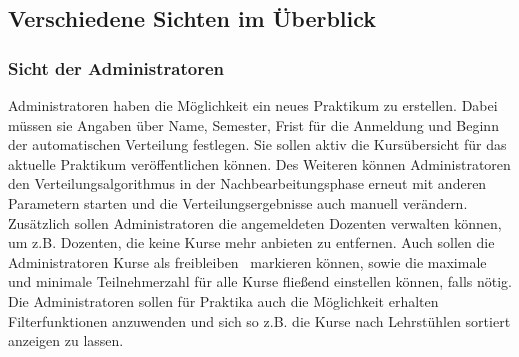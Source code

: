             
                    
        \subsection{Verschiedene Sichten im Überblick}
        \label{Sichten}
            \subsubsection{Sicht der Administratoren}
                Administratoren haben die Möglichkeit ein neues Praktikum zu erstellen.
                Dabei müssen sie Angaben über Name, Semester, Frist für die Anmeldung und Beginn der automatischen Verteilung festlegen.
                Sie sollen aktiv die Kursübersicht für das aktuelle Praktikum veröffentlichen können.
                Des Weiteren können Administratoren den Verteilungsalgorithmus in der Nachbearbeitungsphase erneut mit anderen Parametern starten und die Verteilungsergebnisse auch manuell verändern.
                Zusätzlich sollen Administratoren die angemeldeten Dozenten verwalten können, um z.B. Dozenten, die keine Kurse mehr anbieten zu entfernen.
                Auch sollen die Administratoren Kurse als \glqq freibleiben\grqq~ markieren können, sowie die maximale und minimale Teilnehmerzahl für alle Kurse fließend einstellen können, falls nötig.
                Die Administratoren sollen für Praktika auch die Möglichkeit erhalten Filterfunktionen anzuwenden und sich so z.B. die Kurse nach Lehrstühlen sortiert anzeigen zu lassen.
    
